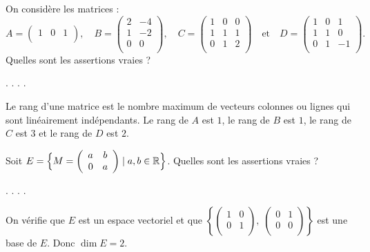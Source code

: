 \begin{question}
On considère les matrices : 
$$A=  \left(\begin{array}{rcc}
1&0&1\\\end{array}\right),\quad B=  
\left(\begin{array}{rcc}2&-4\\
1&-2\\ 0&0\\
\end{array}\right),\quad C=  
\left(\begin{array}{rcc}1&0&0\\1&1&1\\ 0&1&2\\ 
\end{array}\right)\quad \mbox{et}\quad D=  
\left(\begin{array}{rcc}1&0&1\\1&1&0\\ 0&1&-1\\ 
\end{array}\right). $$
Quelles sont les assertions vraies ?
\begin{answers}  
.
.
.
.
\end{answers}
\begin{explanations} Le rang d'une matrice est le nombre maximum de vecteurs colonnes ou lignes qui sont linéairement indépendants. Le rang de $A$ est $1$, le rang de $B$ est $1$, le rang de $C$ est $3$ et le rang de $D$ est $2$.
\end{explanations}
\end{question} 
 
\begin{question}
Soit $E= \Big\{M=\left(\begin{array}{rc}
a&b\\0&a\\ \end{array}\right) \mid a,b \in \mathbb{R} \Big\}$. 
Quelles sont les assertions vraies ?
\begin{answers}  
.
.
.
.
\end{answers}
\begin{explanations} On vérifie que $E$ est un espace vectoriel et que $\left\{\left(\begin{array}{rc}
1&0\\0&1\\ \end{array}\right), \; \left(\begin{array}{rc}
0&1\\0&0\\ \end{array}\right)\right \}$ est une base de $E$. Donc $\dim E = 2$.
\end{explanations}
\end{question}


